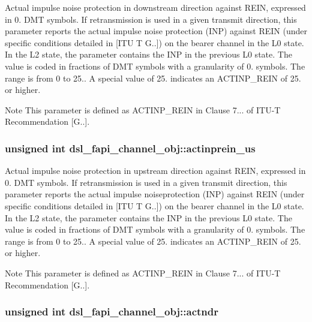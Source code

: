 Actual impulse noise protection in downstream direction against R\-E\-I\-N, expressed in 0. D\-M\-T symbols. If retransmission is used in a given transmit direction, this parameter reports the actual impulse noise protection (I\-N\-P) against R\-E\-I\-N (under specific conditions detailed in \mbox{[}I\-T\-U T G..\mbox{]}) on the bearer channel in the L0 state. In the L2 state, the parameter contains the I\-N\-P in the previous L0 state. The value is coded in fractions of D\-M\-T symbols with a granularity of 0. symbols. The range is from 0 to 25.. A special value of 25. indicates an A\-C\-T\-I\-N\-P\-\_\-\-R\-E\-I\-N of 25. or higher. \begin{DoxyNote}{Note}
This parameter is defined as A\-C\-T\-I\-N\-P\-\_\-\-R\-E\-I\-N in Clause 7... of I\-T\-U-\/\-T Recommendation \mbox{[}G..\mbox{]}. 
\end{DoxyNote}
\hypertarget{structdsl__fapi__channel__obj_a84244d655abf241d2987bdfde0e55923}{
\subsubsection[{actinprein\-\_\-us}]{\setlength{\rightskip}{0pt plus 5cm}unsigned int dsl\-\_\-fapi\-\_\-channel\-\_\-obj\-::actinprein\-\_\-us}}\label{structdsl__fapi__channel__obj_a84244d655abf241d2987bdfde0e55923}
Actual impulse noise protection in upstream direction against R\-E\-I\-N, expressed in 0. D\-M\-T symbols. If retransmission is used in a given transmit direction, this parameter reports the actual impulse noiseprotection (I\-N\-P) against R\-E\-I\-N (under specific conditions detailed in \mbox{[}I\-T\-U T G..\mbox{]}) on the bearer channel in the L0 state. In the L2 state, the parameter contains the I\-N\-P in the previous L0 state. The value is coded in fractions of D\-M\-T symbols with a granularity of 0. symbols. The range is from 0 to 25.. A special value of 25. indicates an A\-C\-T\-I\-N\-P\-\_\-\-R\-E\-I\-N of 25. or higher. \begin{DoxyNote}{Note}
This parameter is defined as A\-C\-T\-I\-N\-P\-\_\-\-R\-E\-I\-N in Clause 7... of I\-T\-U-\/\-T Recommendation \mbox{[}G..\mbox{]}. 
\end{DoxyNote}
\hypertarget{structdsl__fapi__channel__obj_aac4a976754d78dde713ac994f3747e04}{
\subsubsection[{actndr}]{\setlength{\rightskip}{0pt plus 5cm}unsigned int dsl\-\_\-fapi\-\_\-channel\-\_\-obj\-::actndr}}\label{structdsl__fapi__channel__obj_aac4a976754d78dde713ac994f3747e04}
